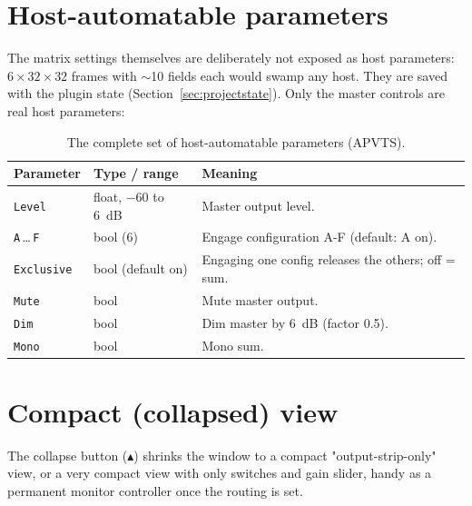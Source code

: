 \section{Host-automatable parameters}
The matrix settings themselves are deliberately not exposed as host parameters: $6 \times 32 \times 32$ frames with $\sim$10 fields each would swamp any host. They are saved with the plugin state (Section~\ref{sec:projectstate}). Only the master controls are real host parameters:

\begin{table}[ht]
\centering
\renewcommand{\arraystretch}{1.25}
\begin{tabularx}{\textwidth}{l l X}
\toprule
\textbf{Parameter} & \textbf{Type / range} & \textbf{Meaning} \\
\midrule
\texttt{Level}     & float, \SI{-60}{} to \SI{+6}{\dB} & Master output level. \\
\texttt{A}\,\dots\,\texttt{F} & bool (6) & Engage configuration A-F (default: A on). \\
\texttt{Exclusive} & bool (default on) & Engaging one config releases the others; off = sum. \\
\texttt{Mute}      & bool & Mute master output. \\
\texttt{Dim}       & bool & Dim master by \SI{6}{\dB} (factor 0.5). \\
\texttt{Mono}      & bool & Mono sum. \\
\bottomrule
\end{tabularx}
\caption{The complete set of host-automatable parameters (APVTS).}
\label{tab:params}
\end{table}

\section{Compact (collapsed) view}\label{sec:compact}
The collapse button (\textbf{$\blacktriangle$}) shrinks the window to a compact "output-strip-only" view, or a very compact view with only switches and gain slider, handy as a permanent monitor controller once the routing is set.
